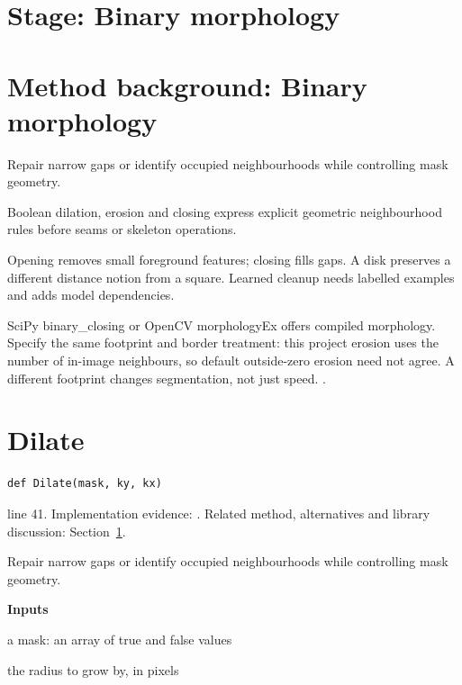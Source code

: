 \section*{Stage: Binary morphology}
\section{Method background: Binary morphology}\label{method:morph}
Repair narrow gaps or identify occupied neighbourhoods while controlling mask geometry.


Boolean dilation, erosion and closing express explicit geometric neighbourhood rules before seams or skeleton operations.


Opening removes small foreground features; closing fills gaps. A disk preserves a different distance notion from a square. Learned cleanup needs labelled examples and adds model dependencies.


SciPy binary\_closing or OpenCV morphologyEx offers compiled morphology. Specify the same footprint and border treatment: this project erosion uses the number of in-image neighbours, so default outside-zero erosion need not agree. A different footprint changes segmentation, not just speed. \cite{scipyclose,haralick1987}.


\section{Dilate}\label{fn:segment:Dilate}
\begin{lstlisting}[style=sig]
def Dilate(mask, ky, kx)
\end{lstlisting}
 line 41. Implementation evidence: \cite{code2026}. Related method, alternatives and library discussion: Section~\ref{method:morph}.


Repair narrow gaps or identify occupied neighbourhoods while controlling mask geometry.




\noindent\textbf{Inputs}
\begin{description}[leftmargin=2.2em,style=nextline,font=\normalfont\ttfamily]\setlength\itemsep{1pt}
  \item[{m}] \normalfont a mask: an array of true and false values
  \item[{r}] \normalfont the radius to grow by, in pixels
\end{description}

